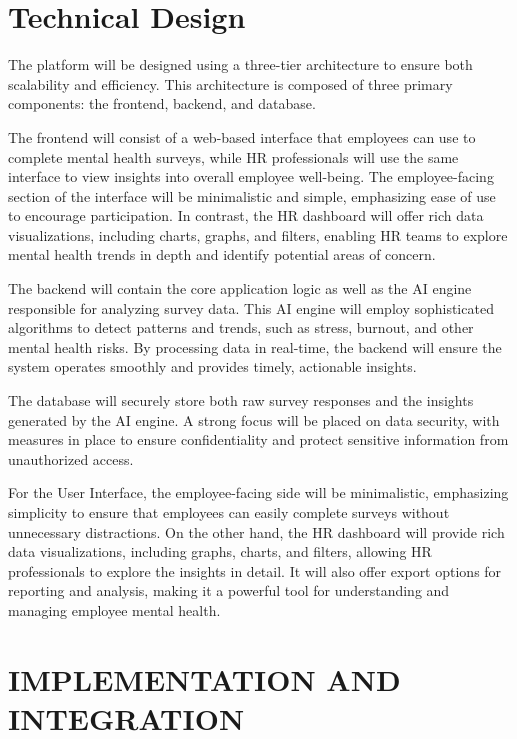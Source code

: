 \documentclass[conference]{IEEEtran}
\begin{document}
\section{Technical Design}
The platform will be designed using a three-tier
architecture to ensure both scalability and efficiency. This
architecture is composed of three primary components: the
frontend, backend, and database.\newline

The frontend will consist of a web-based interface that
employees can use to complete mental health surveys, while
HR professionals will use the same interface to view insights
into overall employee well-being. The employee-facing
section of the interface will be minimalistic and simple,
emphasizing ease of use to encourage participation. In
contrast, the HR dashboard will offer rich data visualizations,
including charts, graphs, and filters, enabling HR teams to
explore mental health trends in depth and identify potential
areas of concern.\newline

The backend will contain the core application logic as well
as the AI engine responsible for analyzing survey data. This
AI engine will employ sophisticated algorithms to detect
patterns and trends, such as stress, burnout, and other mental
health risks. By processing data in real-time, the backend will
ensure the system operates smoothly and provides timely,
actionable insights.\newline

The database will securely store both raw survey responses
and the insights generated by the AI engine. A strong focus
will be placed on data security, with measures in place to
ensure confidentiality and protect sensitive information from
unauthorized access.\newline

For the User Interface, the employee-facing side will be
minimalistic, emphasizing simplicity to ensure that employees
can easily complete surveys without unnecessary distractions.
On the other hand, the HR dashboard will provide rich data
visualizations, including graphs, charts, and filters, allowing
HR professionals to explore the insights in detail. It will also
offer export options for reporting and analysis, making it a
powerful tool for understanding and managing employee
mental health.
\newline

\section{IMPLEMENTATION AND INTEGRATION}
\end{document}
